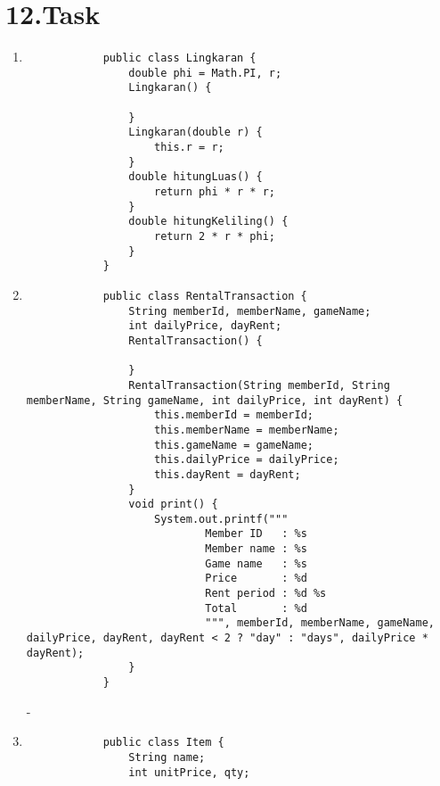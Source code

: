 \documentclass[12pt,titlepage]{article}
\begin{document}
\newpage

\section*{12.Task}

\begin{enumerate}
    \item {
        \begin{verbatim}
            public class Lingkaran {
                double phi = Math.PI, r;
                Lingkaran() {

                }
                Lingkaran(double r) {
                    this.r = r;
                }
                double hitungLuas() {
                    return phi * r * r;
                }
                double hitungKeliling() {
                    return 2 * r * phi;
                }
            }
        \end{verbatim}
    }
    \item {
        \begin{verbatim}
            public class RentalTransaction {
                String memberId, memberName, gameName;
                int dailyPrice, dayRent;
                RentalTransaction() {

                }
                RentalTransaction(String memberId, String memberName, String gameName, int dailyPrice, int dayRent) {
                    this.memberId = memberId;
                    this.memberName = memberName;
                    this.gameName = gameName;
                    this.dailyPrice = dailyPrice;
                    this.dayRent = dayRent;
                }
                void print() {
                    System.out.printf("""
                            Member ID   : %s
                            Member name : %s
                            Game name   : %s
                            Price       : %d
                            Rent period : %d %s
                            Total       : %d
                            """, memberId, memberName, gameName, dailyPrice, dayRent, dayRent < 2 ? "day" : "days", dailyPrice * dayRent);
                }
            }
        \end{verbatim}
        -

    }
    \item {
        \begin{verbatim}
            public class Item {
                String name;
                int unitPrice, qty;


\end{verbatim}}
\end{enumerate}
\end{document}
